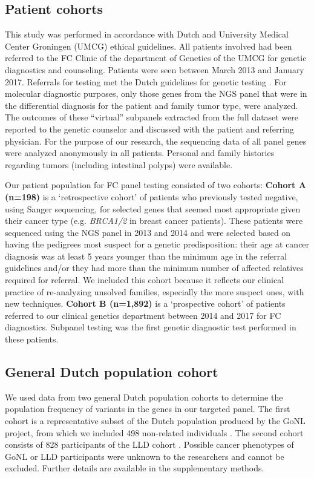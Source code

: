 \subsection{Patient cohorts}
This study was performed in accordance with Dutch and University Medical Center Groningen (UMCG) ethical guidelines. 
All patients involved had been referred to the FC Clinic of the department of Genetics of the UMCG for genetic diagnostics and counseling. 
Patients were seen between March 2013 and January 2017. Referrals for testing met the Dutch guidelines for genetic testing \cite{Erfelijk_2010}. 
For molecular diagnostic purposes, only those genes from the NGS panel that were in the differential diagnosis for the patient and family tumor type, were analyzed. 
The outcomes of these “virtual” subpanels extracted from the full dataset were reported to the genetic counselor and discussed with the patient and referring physician. 
For the purpose of our research, the sequencing data of all panel genes were analyzed anonymously in all patients. 
Personal and family histories regarding tumors (including intestinal polyps) were available. 

Our patient population for FC panel testing consisted of two cohorts: \newline
\noindent\textbf{Cohort A (n=198)} is a ‘retrospective cohort’ of patients who previously tested negative, using Sanger sequencing, for selected genes that seemed most appropriate given their cancer type (e.g. \textsl{BRCA1/2} in breast cancer patients). 
These patients were sequenced using the NGS panel in 2013 and 2014 and were selected based on having the pedigrees most suspect for a genetic predisposition: their age at cancer diagnosis was at least 5 years younger than the minimum age in the referral guidelines and/or they had more than the minimum number of affected relatives required for referral. 
We included this cohort because it reflects our clinical practice of re-analyzing unsolved families, especially the more suspect ones, with new techniques.
\newline
\noindent\textbf{Cohort B (n=1,892)} is a ‘prospective cohort’ of patients referred to our clinical genetics department between 2014 and 2017 for FC diagnostics. 
Subpanel testing was the first genetic diagnostic test performed in these patients. 

\subsection{General Dutch population cohort}
We used data from two general Dutch population cohorts to determine the population frequency of variants in the genes in our targeted panel. 
The first cohort is a representative subset of the Dutch population produced by the GoNL project, from which we included 498 non-related individuals \cite{Francioli_2014}. 
The second cohort consists of 828 participants of the LLD cohort \cite{Tigchelaar_2015}. 
Possible cancer phenotypes of GoNL or LLD participants were unknown to the researchers and cannot be excluded. Further details are available in the supplementary methods.

